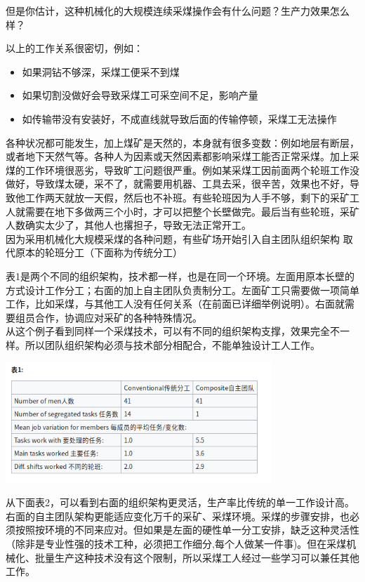 但是你估计，这种机械化的大规模连续采煤操作会有什么问题？生产力效果怎么样？

以上的工作关系很密切，例如：

\begin{itemize}
\tightlist
\item
  如果洞钻不够深，采煤工便采不到煤
\item
  如果切割没做好会导致采煤工可采空间不足，影响产量
\item
  如传输带没有安装好，不成直线就导致后面的传输停顿，采煤工无法操作
\end{itemize}

各种状况都可能发生，加上煤矿是天然的，本身就有很多变数：例如地层有断层，或者地下天然气等。各种人为因素或天然因素都影响采煤工能否正常采煤。加上采煤的工作环境很恶劣，导致旷工问题很严重。例如某采煤工因前面两个轮班工作没做好，导致煤太硬，采不了，就需要用机器、工具去采，很辛苦，效果也不好，导致他工作两天就放一天假，然后也不补班。有些轮班因为人手不够，剩下的采矿工人就需要在地下多做两三个小时，才可以把整个长壁做完。最后当有些轮班，采矿人数确实太少了，其他人也撂担子，导致无法正常开工。\\
因为采用机械化大规模采煤的各种问题，有些矿场开始引入自主团队组织架构
取代原本的轮班分工（下面称为传统分工）

表1是两个不同的组织架构，技术都一样，也是在同一个环境。左面用原本长壁的方式设计工作分工；右面的加上自主团队负责制分工。左面矿工只需要做一项简单工作，比如采煤，与其他工人没有任何关系（在前面已详细举例说明）。右面就需要组员合作，协调应对采矿的各种特殊情况。\\
从这个例子看到同样一个采煤技术，可以有不同的组织架构支撑，效果完全不一样。所以团队组织架构必须与技术部分相配合，不能单独设计工人工作。



\includegraphics[width=10cm]{Screenshotfrom2022-12-2806-56-48.png}

从下面表2，可以看到右面的组织架构更灵活，生产率比传统的单一工作设计高。右面的自主团队架构更能适应变化万千的采矿、采煤环境。采煤的步骤安排，也必须按照按环境的不同来应对。但如果是左面的硬性单一分工安排，缺乏这种灵活性（除非是专业性强的技术工种，必须把工作细分,每个人做某一件事)。但在采煤机械化、批量生产这种技术没有这个限制，所以采煤工人经过一些学习可以兼任其他工作。

